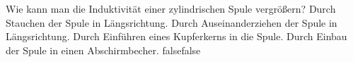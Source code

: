     {Wie kann man die Induktivität einer zylindrischen Spule vergrößern?}
    {Durch Stauchen der Spule in Längsrichtung.}
    {Durch Auseinanderziehen der Spule in Längsrichtung.}
    {Durch Einführen eines Kupferkerns in die Spule.}
    {Durch Einbau der Spule in einen Abschirmbecher.}
    {false}{false}